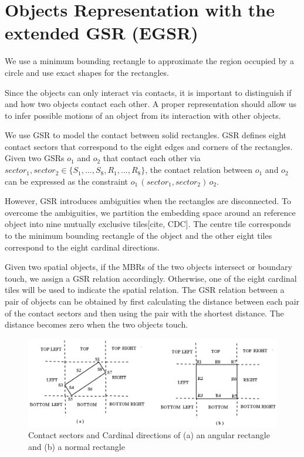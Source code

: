 \documentclass[letterpaper]{article}
\begin{document}
 
\section{Objects Representation with the extended GSR (EGSR)}

We use a minimum bounding rectangle to approximate the region occupied by a circle and use exact shapes for the rectangles.

Since the objects can only interact via contacts, it is important to distinguish if and how two objects contact each other. A proper representation should allow us to infer possible motions of an object from its interaction with other objects. 

We use GSR\cite{} to model the contact between solid rectangles. GSR defines eight contact sectors that correspond to the eight edges and corners of the rectangles. Given two GSRs $o_1$ and $o_2$ that contact each other via $sector_1, sector_2 \in \{S_1, ..., S_8, R_1, ..., R_8\}$, the contact relation between $o_1$ and $o_2$ can be expressed as the constraint $o_1 \, (sector_1, sector_2) \, o_2$. 

However, GSR introduces ambiguities when the rectangles are disconnected. To overcome the ambiguities, we partition the embedding space around an reference object into nine mutually exclusive tiles[cite, CDC]. The centre tile corresponds to the minimum bounding rectangle of the object and the other eight tiles correspond to the eight cardinal directions. 


Given two spatial objects, if the MBRs of the two objects intersect or boundary touch, we assign a GSR relation accordingly. Otherwise, one of the eight cardinal tiles will be used to indicate the spatial relation. The GSR relation between a pair of objects can be obtained by first calculating the distance between each pair of the contact sectors and then using the pair with the shortest distance. The distance becomes zero when the two objects touch. 

\begin{figure}[h!]
\centering\includegraphics[scale=0.25]{EGSR-relations.png}\caption{Contact sectors and Cardinal directions of (a) an angular rectangle and (b) a normal rectangle}
\end{figure}
\end{document}

